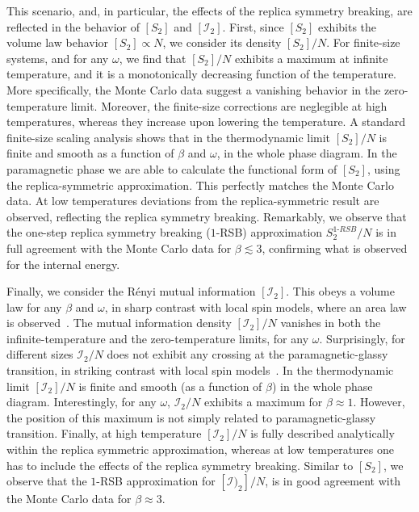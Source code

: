 \documentclass[twocolumn,superscriptaddress,prb,10pt]{revtex4-1}
\begin{document}
This scenario, and, in particular, the effects of the replica symmetry breaking, are 
reflected in the behavior of $[S_2]$ and $[{\mathcal I}_2]$. First, since $[S_2]$ exhibits 
the volume law behavior $[S_2]\propto N$, we consider its density $[S_2]/N$. For finite-size 
systems, and for any $\omega$, we find that $[S_2]/N$ exhibits a maximum at infinite 
temperature, and it is a monotonically decreasing function of the temperature. More 
specifically, the Monte Carlo data suggest a vanishing behavior in the zero-temperature 
limit. Moreover, the finite-size corrections are neglegible at high temperatures, 
whereas they increase upon lowering the temperature. A standard finite-size scaling 
analysis shows that in the thermodynamic limit $[S_2]/N$ is finite and smooth as a 
function of $\beta$ and $\omega$, in the whole phase diagram. In the paramagnetic phase 
we are able to calculate the functional form of $[S_2]$, using the replica-symmetric 
approximation. This perfectly matches the Monte Carlo data. At low temperatures deviations 
from the replica-symmetric result are observed, reflecting the replica symmetry breaking. 
Remarkably, we observe that the one-step replica symmetry breaking ($1$-RSB) approximation 
$S_2^{1\textrm{-}RSB}/N$ is in full agreement with the Monte Carlo data for $\beta
\lesssim 3$, confirming what is observed for the internal energy. 

Finally, we consider the R\'enyi mutual information $[{\mathcal I}_2]$. This  
obeys a volume law for any $\beta$ and $\omega$, in sharp contrast with local spin models, 
where an area law is observed~\cite{wolf-2008}. The mutual information density $[{\mathcal I}_2]/N$ 
vanishes in both the infinite-temperature and the zero-temperature limits, for any $\omega$. 
Surprisingly, for different sizes ${\mathcal I}_2/N$ does not exhibit any crossing at the 
paramagnetic-glassy transition, in striking contrast with local spin models~\cite{jaconis-2013}. 
In the thermodynamic limit $[{\mathcal I}_2]/N$ is finite and smooth (as a function of $\beta$) 
in the whole phase diagram. Interestingly, for any $\omega$, ${\mathcal I}_2/N$ exhibits a 
maximum for $\beta\approx 1$. However, the position of this maximum is not simply related to 
paramagnetic-glassy transition. Finally, at high temperature $[{\mathcal I}_2]/N$ is fully 
described analytically within the replica symmetric approximation, whereas at low temperatures 
one has to include  the effects of the replica symmetry breaking. Similar to $[S_2]$, we observe 
that the $1$-RSB approximation for $[{\mathcal I})_2]/N$, is in good agreement with the Monte Carlo 
data for $\beta\approx 3$.
\end{document}
